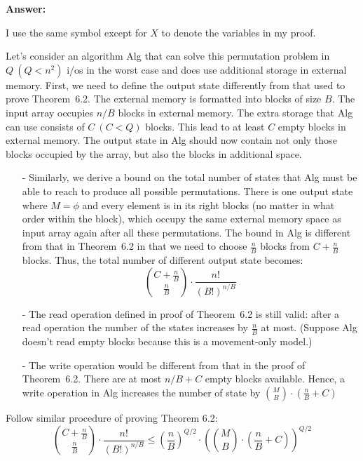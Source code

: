 \documentclass{article}
\renewcommand{\leq}{\leqslant}
\newcommand{\alg}{{\sc Alg}\xspace}
\newcommand{\io}{{\sc i/o}\xspace}
\newcommand{\ios}{{\io}s\xspace}
\newcounter{rcounter}
\newenvironment{rlist}%
{\begin{list}{\setnr-\arabic{rcounter}}{\usecounter{rcounter}}}{\end{list}}
\begin{document}
\begin{rlist}
        \textbf{Answer:}
        
        I use the same symbol except for $X$ to denote the variables in my proof.
        
        Let's consider an algorithm {\sc Alg} that can solve this permutation problem in $Q~(Q<n^2)$ \ios in the worst case and does use additional storage in external memory. First, we need to define the output state differently from that used to prove Theorem~6.2. The external memory is formatted into blocks of size $B$. The input array occupies $n/B$ blocks in external memory. The extra storage that \alg can use consists of $C~(C<Q)$ blocks. This lead to at least $C$ empty blocks in external memory. The output state in \alg should now contain not only those blocks occupied by the array, but also the blocks in additional space. %
        \begin{enumerate}
            \item[-] Similarly, we derive a bound on the total number of states that \alg must be able to reach to produce all possible permutations. There is one output state where $M=\phi$ and every element is in its right blocks (no matter in what order within the block), which occupy the same external memory space as input array again after all these permutations. The bound in \alg is different from that in Theorem~6.2 in that we need to choose $\frac{n}{B}$ blocks from $C+\frac{n}{B}$ blocks. Thus, the total number of different output state becomes:
            $$\binom{C+\frac{n}{B}}{\frac{n}{B}} \cdot \frac{n!}{(B!)^{n/B}}$$
            \item[-] The read operation defined in proof of Theorem~6.2 is still valid: after a read operation the number of the states increases by $\frac{n}{B}$ at most. (Suppose \alg doesn't read empty blocks because this is a movement-only model.)
            \item[-] The write operation would be different from that in the proof of Theorem~6.2. There are at most $n/B+C$ empty blocks available. Hence, a write operation in \alg increases the number of state by $\binom{M}{B}\cdot (\frac{n}{B}+C)$
        \end{enumerate}
        Follow similar procedure of proving Theorem 6.2:
        $$\binom{C+\frac{n}{B}}{\frac{n}{B}} \cdot \frac{n!}{(B!)^{n/B}} \leq (\frac{n}{B})^{Q/2} \cdot (\binom{M}{B}\cdot (\frac{n}{B}+C))^{Q/2}$$

\end{rlist}
\end{document}

